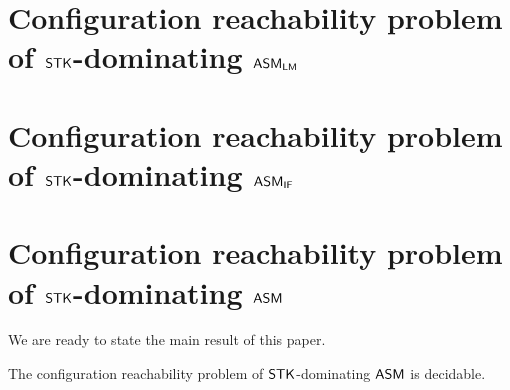 


\section{Configuration reachability problem of $\mathsf{STK}$-dominating $\textsf{ASM}_\textsf{LM}$}\label{sec:reach-lmamass}


\section{Configuration reachability problem of $\mathsf{STK}$-dominating $\textsf{ASM}_\textsf{IF}$}\label{sec:reach-ifamass}



\section{Configuration reachability problem of $\mathsf{STK}$-dominating $\textsf{ASM}$}\label{sec:reach-amass}

We are ready to state the main result of this paper. 

\begin{theorem}\label{thm:st-amass-reach}
	The configuration reachability problem of $\mathsf{STK}$-dominating $\textsf{ASM}$ is decidable.
\end{theorem}


